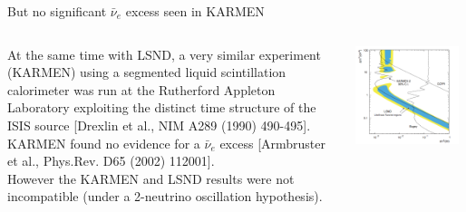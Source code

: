\begin{frame}[t]{But no significant $\bar{\nu}_{e}$ excess seen in KARMEN}

\begin{columns}
  \begin{column}{0.35\textwidth}
  {\scriptsize
    At the same time with LSND, a very similar experiment (KARMEN) using a segmented liquid scintillation calorimeter
    was run at the Rutherford Appleton Laboratory exploiting the distinct time structure of the ISIS source
    {\color{blue}[Drexlin et al., NIM A289 (1990) 490-495]}. \\
    \vspace{0.5cm}
    KARMEN found no evidence for a $\bar{\nu}_{e}$ excess
    {\color{blue}[Armbruster et al., Phys.Rev. D65 (2002) 112001]}.\\
    \vspace{0.5cm}
    However the KARMEN and LSND results were not incompatible (under a 2-neutrino oscillation hypothesis).\\
  }
  \end{column}
  \begin{column}{0.65\textwidth}
    \includegraphics[width=0.95\textwidth]{./images/beyond3nu/accelerator/lsnd_karmen_combined.png}
  \end{column}
\end{columns}
\end{frame}


